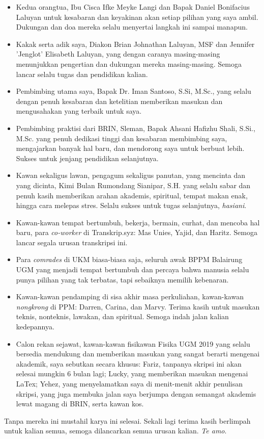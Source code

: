 \documentclass{skripsiactugm}
\begin{document}
\begin{itemize}
    \item Kedua orangtua, Ibu Cisca Ifke Meyke Langi dan Bapak Daniel Bonifacius Laluyan untuk kesabaran dan keyakinan akan setiap pilihan yang saya ambil. Dukungan dan doa mereka selalu menyertai langkah ini sampai manapun.
    \item Kakak serta adik saya, Diakon Brian Johnathan Laluyan, MSF dan Jennifer 'Jenglot' Elisabeth Laluyan, yang dengan caranya masing-masing menunjukkan pengertian dan dukungan mereka masing-masing. Semoga lancar selalu tugas dan pendidikan kalian.
    \item Pembimbing utama saya, Bapak Dr. Iman Santoso, S.Si, M.Sc., yang selalu dengan penuh kesabaran dan ketelitian memberikan masukan dan mengusahakan yang terbaik untuk saya.
    \item Pembimbing praktisi dari BRIN, Sleman, Bapak Ahsani Hafizhu Shali, S.Si., M.Sc. yang penuh dedikasi tinggi dan kesabaran membimbing saya, mengajarkan banyak hal baru, dan mendorong saya untuk berbuat lebih. Sukses untuk jenjang pendidikan selanjutnya.
    \item Kawan sekaligus lawan, pengagum sekaligus panutan, yang mencinta dan yang dicinta, Kimi Bulan Rumondang Sianipar, S.H. yang selalu sabar dan penuh kasih memberikan arahan akademis, spiritual, tempat makan enak, hingga cara melepas stres. Selalu sukses untuk tugas selanjutnya, \textit{hasiani}.
    \item Kawan-kawan tempat bertumbuh, bekerja, bermain, curhat, dan mencoba hal baru, para \textit{co-worker} di Transkrip.syz: Mas Unies, Yajid, dan Haritz. Semoga lancar segala urusan transkripsi ini.
    \item Para \textit{comrades} di UKM biasa-biasa saja, seluruh awak BPPM Balairung UGM yang menjadi tempat bertumbuh dan percaya bahwa manusia selalu punya pilihan yang tak terbatas, tapi sebaiknya memilih kebenaran.
    \item Kawan-kawan pendamping di sisa akhir masa perkuliahan, kawan-kawan \textit{nongkrong} di PPM: Darren, Carina, dan Marvy. Terima kasih untuk masukan teknis, nonteknis, lawakan, dan spiritual. Semoga indah jalan kalian kedepannya.
    \item Calon rekan sejawat, kawan-kawan fisikawan Fisika UGM 2019 yang selalu bersedia mendukung dan memberikan masukan yang sangat berarti mengenai akademik, saya sebutkan secara khusus: Fariz, tanpanya skripsi ini akan selesai mungkin 6 bulan lagi; Lucky, yang memberikan masukan mengenai LaTex; Yehez, yang menyelamatkan saya di menit-menit akhir penulisan skripsi, yang juga membuka jalan saya berjumpa dengan semangat akademis lewat magang di BRIN, serta kawan kos.
\end{itemize}
Tanpa mereka ini mustahil karya ini selesai. Sekali lagi terima kasih berlimpah untuk kalian semua, semoga dilancarkan semua urusan kalian. \textit{Te amo}.
\end{document}
